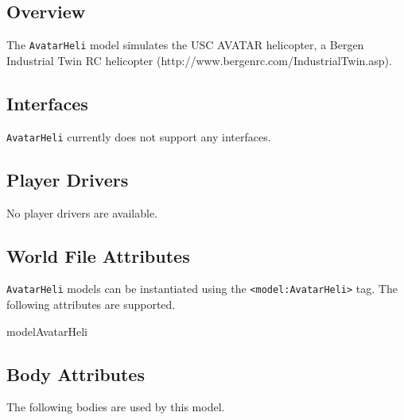
\subsection{Overview}

The {\tt AvatarHeli} model simulates the USC AVATAR helicopter, a Bergen Industrial Twin RC helicopter (http://www.bergenrc.com/IndustrialTwin.asp).

\subsection{\libgazebo Interfaces}

{\tt AvatarHeli} currently does not support any interfaces. 


\subsection{Player Drivers}

No player drivers are available.

\subsection{World File Attributes}

{\tt AvatarHeli} models can be instantiated using the
\verb+<model:AvatarHeli>+ tag.  The following attributes are
supported.

\begin{xmlattrtable}{model}{AvatarHeli}
\modeldefaults
\end{xmlattrtable}


\subsection{Body Attributes}

The following bodies are used by this model.

\begin{bodyattrtable}
\bodydefaults
\end{bodyattrtable}
